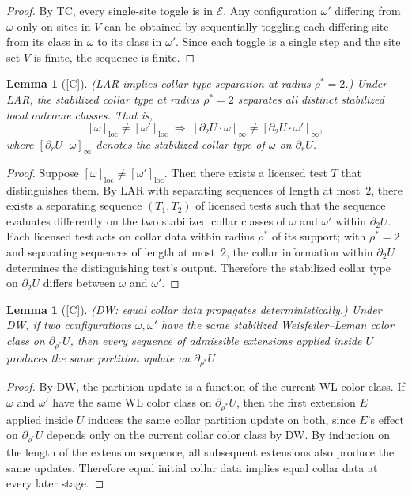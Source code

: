 \documentclass[12pt,oneside]{amsbook}
\theoremstyle{plain}
\newtheorem{lemma}[theorem]{Lemma}
\theoremstyle{definition}
\theoremstyle{remark}
\newcommand{\status}[1]{\textup{[#1]}}
\begin{document}
\begin{proof}
By TC, every single-site toggle is in $\mathcal{E}$.  Any
configuration $\omega'$ differing from $\omega$ only on sites in $V$
can be obtained by sequentially toggling each differing site from its
class in $\omega$ to its class in $\omega'$.  Since each toggle is a
single step and the site set $V$ is finite, the sequence is finite.
\end{proof}

\begin{lemma}[\status{C}]\label{lem:LAR-separation}
\textup{(LAR implies collar-type separation at radius $\rho^* = 2$.)}
Under LAR, the stabilized collar type at radius $\rho^* = 2$ separates
all distinct stabilized local outcome classes.  That is,
\[
  [\omega]_{\mathrm{loc}} \neq [\omega']_{\mathrm{loc}}
  \;\Longrightarrow\;
  [\partial_2 U \cdot \omega]_\infty \neq [\partial_2 U \cdot \omega']_\infty,
\]
where $[\partial_r U \cdot \omega]_\infty$ denotes the stabilized
collar type of $\omega$ on $\partial_r U$.
\end{lemma}

\begin{proof}
Suppose $[\omega]_{\mathrm{loc}} \neq [\omega']_{\mathrm{loc}}$.
Then there exists a licensed test $T$ that distinguishes them.  By LAR
with separating sequences of length at most~$2$, there exists a
separating sequence $(T_1, T_2)$ of licensed tests such that the
sequence evaluates differently on the two stabilized collar classes of
$\omega$ and $\omega'$ within $\partial_2 U$.  Each licensed test acts
on collar data within radius $\rho^*$ of its support; with $\rho^* =
2$ and separating sequences of length at most~$2$, the collar
information within $\partial_2 U$ determines the distinguishing test's
output.  Therefore the stabilized collar type on $\partial_2 U$ differs
between $\omega$ and $\omega'$.
\end{proof}

\begin{lemma}[\status{C}]\label{lem:DW-propagation}
\textup{(DW: equal collar data propagates deterministically.)}  Under
DW, if two configurations $\omega, \omega'$ have the same stabilized
Weisfeiler--Leman color class on $\partial_{\rho^*} U$, then every
sequence of admissible extensions applied inside $U$ produces the same
partition update on $\partial_{\rho^*} U$.
\end{lemma}

\begin{proof}
By DW, the partition update is a function of the current WL color
class.  If $\omega$ and $\omega'$ have the same WL color class on
$\partial_{\rho^*} U$, then the first extension $E$ applied inside $U$
induces the same collar partition update on both, since $E$'s effect
on $\partial_{\rho^*} U$ depends only on the current collar color
class by DW.  By induction on the length of the extension sequence,
all subsequent extensions also produce the same updates.  Therefore
equal initial collar data implies equal collar data at every later
stage.
\end{proof}
\end{document}
